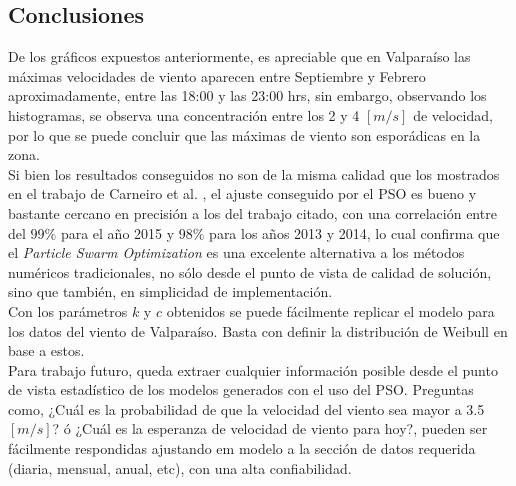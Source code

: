\subsection{Conclusiones}
De los gráficos expuestos anteriormente, es apreciable que en Valparaíso las máximas velocidades de viento aparecen entre Septiembre y Febrero aproximadamente, entre las 18:00 y las 23:00 hrs, sin embargo, observando los histogramas, se observa una concentración entre los 2 y 4 $[m/s]$ de velocidad, por lo que se puede concluir que las máximas de viento son esporádicas en la zona.\\ 
Si bien los resultados conseguidos no son de la misma calidad que los mostrados en el trabajo de Carneiro et al. \cite{Carneiro15}, el ajuste conseguido por el PSO es bueno y bastante cercano en precisión a los del trabajo citado, con una correlación entre del $99\%$ para el año 2015 y $98\%$ para los años 2013 y 2014, lo cual confirma que el \emph{Particle Swarm Optimization} es una excelente alternativa a los métodos numéricos tradicionales, no sólo desde el punto de vista de calidad de solución, sino que también, en simplicidad de implementación.\\
Con los parámetros $k$ y $c$ obtenidos se puede fácilmente replicar el modelo para los datos del viento de Valparaíso. Basta con definir la distribución de Weibull en base a estos.\\
Para trabajo futuro, queda extraer cualquier información posible desde el punto de vista estadístico de los modelos generados con el uso del PSO. Preguntas como, ¿Cuál es la probabilidad de que la velocidad del viento sea mayor a 3.5 $[m/s]$? ó ¿Cuál es la esperanza de velocidad de viento para hoy?, pueden ser fácilmente respondidas ajustando em modelo a la sección de datos requerida (diaria, mensual, anual, etc), con una alta confiabilidad.  